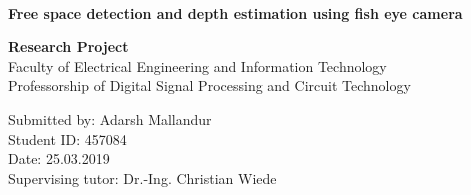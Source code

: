\documentclass[a4paper, 12pt, oneside, BCOR1cm,toc=chapterentrywithdots]{scrbook}
\begin{document}
%
%

\begin{titlepage}

{
    \begin{center}
        \\
    \end{center}
    \vspace{0.5cm}
}

\begin{center}

\LARGE{\textbf{Free space detection and depth estimation using fish eye camera}}\\
\vspace{1cm}


\Large{\textbf{Research Project}}\\ 
\vspace{1cm}
\vspace{0.5cm}
Faculty of Electrical Engineering and Information Technology\\
Professorship of Digital Signal Processing and Circuit Technology
\end{center}
\vspace{2cm}
Submitted by: Adarsh Mallandur\\
Student ID: 457084\\
Date: 25.03.2019\\
Supervising tutor: Dr.-Ing. Christian Wiede \\

\end{titlepage}
\end{document}
